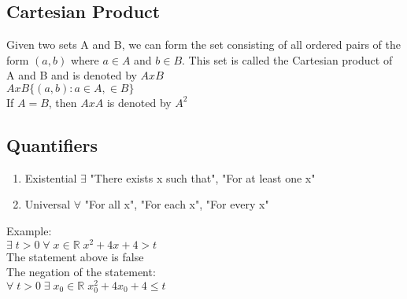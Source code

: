 \documentclass{article}
\begin{document}
\subsection{Cartesian Product}
Given two sets A and B, we can form the set consisting of all ordered pairs of the form $(a, b)$ where $a \in A$ and $b \in B$. This set is called the Cartesian product of A and B and is denoted by $AxB$\\
$AxB \{(a, b): a\in A, \in B \}$ \\
If $A=B$, then $AxA$ is denoted by $A^2$\\

\subsection{Quantifiers}
\begin{enumerate}
	\item  Existential $\exists$ "There exists x such that", "For at least one x"
	\item Universal $\forall$ "For all x", "For each x", "For every x"
\end{enumerate}

Example: \\
$ \exists \; t > 0 \; \forall \; x\in \mathbb{R} \; x^2 + 4x + 4 > t $ \\
The statement above is false \\
The negation of the statement: \\
$ \forall \; t>0 \; \exists \; x_0 \in \mathbb{R} \; x_0^2 + 4x_0 + 4 \leq t $
\end{document}
